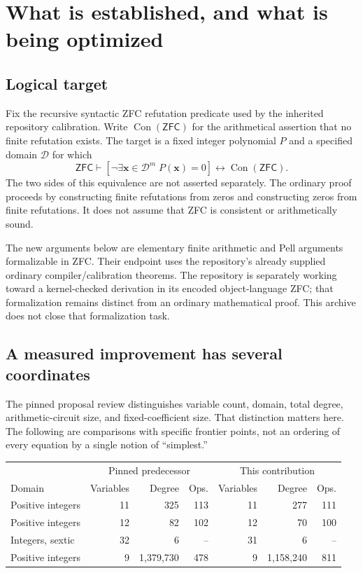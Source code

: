 \documentclass[11pt]{article}
\theoremstyle{definition}
\theoremstyle{remark}
\newcommand{\Con}{\operatorname{Con}}
\newcommand{\ZFC}{\mathsf{ZFC}}
\begin{document}
\section{What is established, and what is being optimized}

\subsection{Logical target}

Fix the recursive syntactic ZFC refutation predicate used by the inherited
repository calibration. Write $\Con(\ZFC)$ for the arithmetical assertion
that no finite refutation exists. The target is a fixed integer polynomial
$P$ and a specified domain $\mathcal D$ for which
\begin{equation}\label{eq:target}
 \ZFC\vdash
 \left[\neg\exists\mathbf x\in\mathcal D^m\;P(\mathbf x)=0\right]
 \longleftrightarrow\Con(\ZFC).
\end{equation}
The two sides of this equivalence are not asserted separately. The ordinary
proof proceeds by constructing finite refutations from zeros and constructing
zeros from finite refutations. It does not assume that ZFC is consistent or
arithmetically sound.

The new arguments below are elementary finite arithmetic and Pell arguments
formalizable in ZFC. Their endpoint uses the repository's already supplied
ordinary compiler/calibration theorems. The repository is separately working
toward a kernel-checked derivation in its encoded object-language ZFC; that
formalization remains distinct from an ordinary mathematical proof. This
archive does not close that formalization task.

\subsection{A measured improvement has several coordinates}

The pinned proposal review \cite{review} distinguishes variable count,
domain, total degree, arithmetic-circuit size, and fixed-coefficient size.
That distinction matters here. The following are comparisons with specific
frontier points, not an ordering of every equation by a single notion of
``simplest.''

\begin{center}
\small
\begin{tabular}{@{}lrrr rrr@{}}
\toprule
 &\multicolumn{3}{c}{Pinned predecessor}&\multicolumn{3}{c}{This contribution}\\
Domain &Variables&Degree&Ops.&Variables&Degree&Ops.\\
\midrule
Positive integers &11&325&113&11&277&111\\
Positive integers &12&82&102&12&70&100\\
Integers, sextic &32&6&--&31&6&--\\
Positive integers &9&1,379,730&478&9&1,158,240&811\\
\bottomrule
\end{tabular}
\end{center}
\end{document}
